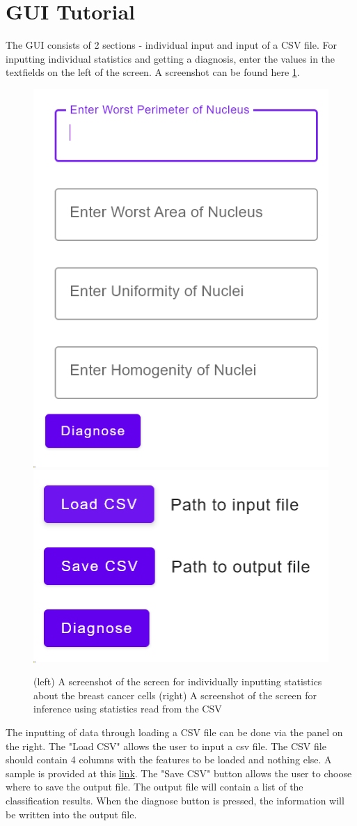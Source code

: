 \section{GUI Tutorial}
The GUI consists of 2 sections - individual input and input of a CSV file. For inputting individual statistics and getting a diagnosis, enter the values in the textfields on the left of the screen. A screenshot can be found here \ref{fig:screenshot}. \\

\begin{figure}[ht!]
	\centering
	\includegraphics[width=0.35\linewidth]{screenshot003}
	\hspace{0.5cm}
	\includegraphics[width=0.35\linewidth]{screenshot004}
        \caption{(left) A screenshot of the screen for individually inputting statistics about the breast cancer cells (right) A screenshot of the screen for inference using statistics read from the CSV}
	\label{fig:screenshot}
\end{figure}

The inputting of data through loading a CSV file can be done via the panel on the right. The "Load CSV" allows the user to input a csv file. The CSV file should contain 4 columns with the features to be loaded and nothing else. A sample is provided at this \href{https://nushighedu-my.sharepoint.com/:x:/g/personal/h1810084_nushigh_edu_sg/ERyyrju9vEJJoOo8wW9L8mYB2RaX_GNevY3PBxZBZaeQCw?e=eewdHe}{link}. The "Save CSV" button allows the user to choose where to save the output file. The output file will contain a list of the classification results. When the diagnose button is pressed, the information will be written into the output file.

